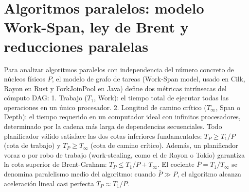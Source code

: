 \documentclass{book}
\begin{document}
\section{Algoritmos paralelos: modelo Work-Span, ley de Brent y reducciones paralelas}

Para analizar algoritmos paralelos con independencia del número concreto de núcleos físicos \(P\), el modelo de grafo de tareas (Work-Span model, usado en Cilk, Rayon en Rust y ForkJoinPool en Java) define dos métricas intrínsecas del cómputo DAG:
1. Trabajo (\(T_1\), Work): el tiempo total de ejecutar todas las operaciones en un único procesador.
2. Longitud de camino crítico (\(T_\infty\), Span o Depth): el tiempo requerido en un computador ideal con infinitos procesadores, determinado por la cadena más larga de dependencias secuenciales.
Todo planificador válido satisface las dos cotas inferiores fundamentales: \(T_P \ge T_1 / P\) (cota de trabajo) y \(T_P \ge T_\infty\) (cota de camino crítico). Además, un planificador voraz o por robo de trabajo (work-stealing, como el de Rayon o Tokio) garantiza la cota superior de Brent-Graham: \(T_P \le T_1 / P + T_\infty\). El cociente \(\overline{P} = T_1 / T_\infty\) se denomina paralelismo medio del algoritmo: cuando \(\overline{P} \gg P\), el algoritmo alcanza aceleración lineal casi perfecta \(T_P \approx T_1 / P\).
\end{document}
